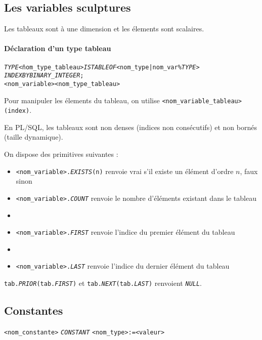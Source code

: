 \documentclass[10pt]{article}
\begin{document}
		\subsection{Les variables sculptures}
			Les tableaux sont à une dimension et les élements sont scalaires.
			
			\paragraph{Déclaration d'un type tableau}   
				\begin{alltt}
					\begin{tabbing}
						\emph{TYPE} \=<nom_type_tableau> \emph{IS TABLE OF} <nom_type | nom_var\%\emph{TYPE}>\\
									\>\emph{INDEX BY BINARY_INTEGER};\\
						<nom_variable> <nom_type_tableau>
					\end{tabbing}
				\end{alltt}
				
			Pour manipuler les élements du tableau, on utilise \texttt{<nom\_variable\_tableau>(index)}.
			
			En PL/SQL, les tableaux sont non denses (indices non consécutifs) et non bornés (taille dynamique).
			
			On dispose des primitives suivantes :
				\begin{itemize}
					\item \texttt{<nom\_variable>.}\emph{\texttt{EXISTS}}\texttt{(n)} renvoie vrai s'il existe un élément d'ordre $n$, faux sinon
					\item \texttt{<nom\_variable>.}\emph{\texttt{COUNT}} renvoie le nombre d'éléments existant dans le tableau
					\item \item \texttt{<nom\_variable>.}\emph{\texttt{FIRST}} renvoie l'indice du premier élément du tableau
					\item \item \texttt{<nom\_variable>.}\emph{\texttt{LAST}} renvoie l'indice du dernier élément du tableau
				\end{itemize}
				
			\texttt{tab.}\emph{\texttt{PRIOR}}\texttt{(tab.}\emph{\texttt{FIRST}}\texttt{)} et \texttt{tab.}\emph{\texttt{NEXT}}\texttt{(tab.}\emph{\texttt{LAST}}\texttt{)} renvoient \emph{\texttt{NULL}}.
			
		\subsection{Constantes}
			\texttt{<nom\_constante>} \emph{\texttt{CONSTANT}} \texttt{<nom\_type>:=<valeur>}
		
\end{document}
